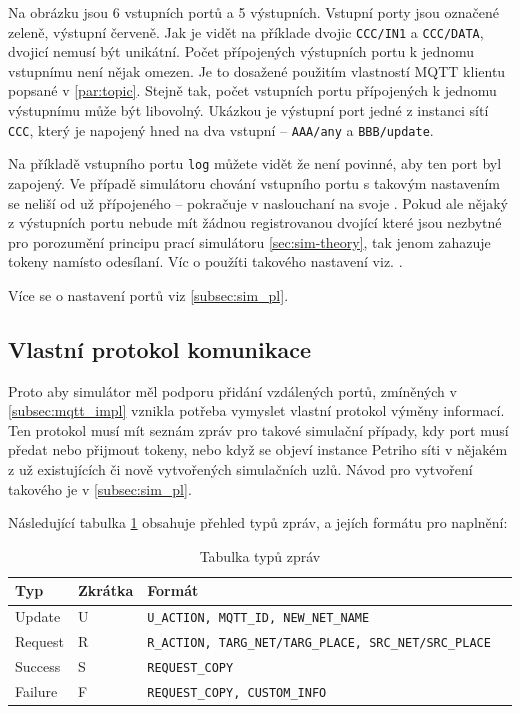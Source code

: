 Na obrázku jsou 6 vstupních portů a 5 výstupních. Vstupní porty jsou označené zeleně, výstupní červeně. Jak je vidět na příklade dvojic \texttt{CCC/IN1} a \texttt{CCC/DATA}, dvojicí nemusí být unikátní. Počet přípojených výstupních portu k jednomu vstupnímu není nějak omezen. Je to dosažené použitím vlastností MQTT klientu popsané v \ref{par:topic}. Stejně tak, počet vstupních portu přípojených k jednomu výstupnímu může být libovolný. Ukázkou je výstupní port jedné z instanci sítí \texttt{CCC}, který je napojený hned na dva vstupní -- \texttt{AAA/any} a \texttt{BBB/update}.

Na příkladě vstupního portu \texttt{log} můžete vidět že není povinné, aby ten port byl zapojený. Ve případě simulátoru chování vstupního portu s takovým nastavením se neliší od už přípojeného -- pokračuje v naslouchaní na svoje . Pokud ale nějaký z výstupních portu nebude mít žádnou registrovanou dvojící  které jsou nezbytné pro porozumění principu prací simulátoru \ref{sec:sim-theory}, tak jenom zahazuje tokeny namísto odesílaní. Víc o použíti takového nastavení viz. .

Více se o nastavení portů viz \ref{subsec:sim_pl}.

\subsection{Vlastní protokol komunikace}
Proto aby simulátor měl podporu přidání vzdálených portů, zmíněných v \ref{subsec:mqtt_impl} vznikla potřeba vymyslet vlastní protokol výměny informací. Ten protokol musí mít seznám zpráv pro takové simulační případy, kdy port musí předat nebo přijmout tokeny, nebo když se objeví instance Petriho síti v nějakém z už existujících či nově vytvořených simulačních uzlů. Návod pro vytvoření takového je v \ref{subsec:sim_pl}.

Následující tabulka \ref{tab:mqtt-msg-types} obsahuje přehled typů zpráv, a jejích formátu pro naplnění:

\begin{table}[H]
	\vskip6pt
	\caption{Tabulka typů zpráv}
    \vskip6pt
	\centering
	\begin{tabular}{lllr}
		\toprule
		Typ & Zkrátka & Formát \\
    \midrule
    Update & U & \texttt{U\_ACTION, MQTT\_ID, NEW\_NET\_NAME} \\
    Request & R & \texttt{R\_ACTION, TARG\_NET/TARG\_PLACE, SRC\_NET/SRC\_PLACE} \\
    Success & S & \texttt{REQUEST\_COPY} \\
    Failure & F & \texttt{REQUEST\_COPY, CUSTOM\_INFO} \\
		\bottomrule
	\end{tabular}
	\label{tab:mqtt-msg-types}
\end{table}

